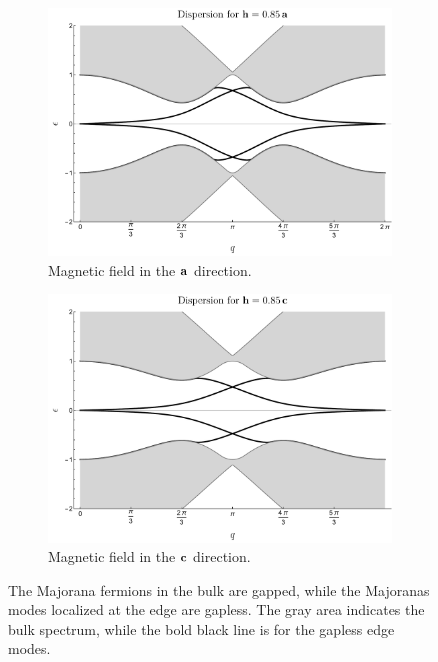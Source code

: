  \begin{figure}[h]
    \centering
        \begin{subfigure}{.5\textwidth}
        \centering
        \includegraphics[width= 1.1\textwidth]{images/CH3/disp_a.pdf}
        \caption{ Magnetic field in the $\bf{a}$ direction.}
        \label{fig:3-disp-a}
    \end{subfigure}%
    \begin{subfigure}{.5\textwidth}
        \centering
        \includegraphics[width= 1.1\textwidth]{images/CH3/disp_c.pdf} 
        \caption{Magnetic field in the $\bf{c}$ direction. }
        \label{fig:3-disp-c}
    \end{subfigure}
\caption{The  Majorana fermions in the bulk are gapped, while the Majoranas modes localized at the edge are gapless. The gray area indicates the bulk spectrum, while the bold black line is for the gapless edge modes. %
}
\end{figure} 

